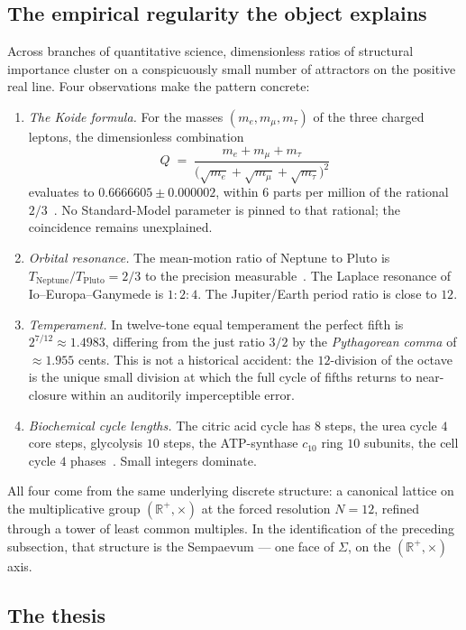 \documentclass[11pt,a4paper]{article}
\theoremstyle{definition}
\theoremstyle{remark}
\newcommand{\R}{\mathbb{R}}
\begin{document}
\subsection{The empirical regularity the object explains}

Across branches of quantitative science, dimensionless ratios of structural importance cluster on a conspicuously small number of attractors on the positive real line. Four observations make the pattern concrete:

\begin{enumerate}[leftmargin=*]
\item \emph{The Koide formula.} For the masses $(m_e,m_{\mu},m_{\tau})$ of the three charged leptons, the dimensionless combination
\[
Q \;=\; \frac{m_e+m_{\mu}+m_{\tau}}{\bigl(\sqrt{m_e}+\sqrt{m_{\mu}}+\sqrt{m_{\tau}}\bigr)^{2}}
\]
evaluates to $0.6666605\pm 0.000002$, within $6$ parts per million of the rational $2/3$~\cite{Koide1982}. No Standard-Model parameter is pinned to that rational; the coincidence remains unexplained.
\item \emph{Orbital resonance.} The mean-motion ratio of Neptune to Pluto is $T_{\mathrm{Neptune}}/T_{\mathrm{Pluto}}=2/3$ to the precision measurable~\cite{CohenHubbard1965}. The Laplace resonance of Io--Europa--Ganymede is $1{:}2{:}4$. The Jupiter/Earth period ratio is close to $12$.
\item \emph{Temperament.} In twelve-tone equal temperament the perfect fifth is $2^{7/12}\approx 1.4983$, differing from the just ratio $3/2$ by the \emph{Pythagorean comma} of $\approx 1.955$ cents. This is not a historical accident: the $12$-division of the octave is the unique small division at which the full cycle of fifths returns to near-closure within an auditorily imperceptible error.
\item \emph{Biochemical cycle lengths.} The citric acid cycle has $8$ steps, the urea cycle $4$ core steps, glycolysis $10$ steps, the ATP-synthase $c_{10}$ ring $10$ subunits, the cell cycle $4$ phases~\cite{Alberts}. Small integers dominate.
\end{enumerate}

All four come from the same underlying discrete structure: a canonical lattice on the multiplicative group $(\R^{+},\times)$ at the forced resolution $N=12$, refined through a tower of least common multiples. In the identification of the preceding subsection, that structure is the Sempaevum --- one face of $\Sigma$, on the $(\R^{+},\times)$ axis.

\subsection{The thesis}
\end{document}
